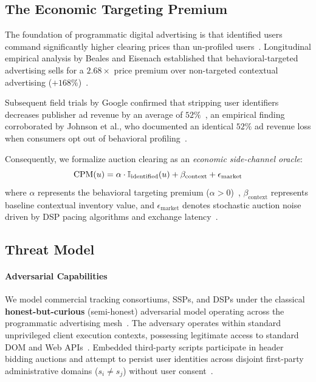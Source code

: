 \subsection{The Economic Targeting Premium}
\label{subsec:targeting_premium}

The foundation of programmatic digital advertising is that identified users command significantly higher clearing prices than un-profiled users~\cite{castelluccia2014selling, bashir2016tracing}. Longitudinal empirical analysis by Beales and Eisenach established that behavioral-targeted advertising sells for a $2.68\times$ price premium over non-targeted contextual advertising ($+168\%$)~\cite{beales2014empirical}. 

Subsequent field trials by Google confirmed that stripping user identifiers decreases publisher ad revenue by an average of $52\%$~\cite{google2019cookie}, an empirical finding corroborated by Johnson et al., who documented an identical $52\%$ ad revenue loss when consumers opt out of behavioral profiling~\cite{johnson2020consumer}. 

Consequently, we formalize auction clearing \cpm as an \textit{economic side-channel oracle}:
\begin{equation}
\text{CPM}(u) = \alpha \cdot \mathbb{I}_{\text{identified}}(u) + \beta_{\text{context}} + \epsilon_{\text{market}}
\label{eq:economic_oracle}
\end{equation}
where $\alpha$ represents the behavioral targeting premium ($\alpha > 0$)~\cite{beales2014empirical, johnson2020consumer}, $\beta_{\text{context}}$ represents baseline contextual inventory value, and $\epsilon_{\text{market}}$ denotes stochastic auction noise driven by DSP pacing algorithms and exchange latency~\cite{barysei2023investigating}.

\subsection{Threat Model}
\label{subsec:threat_model}

\paragraph{Adversarial Capabilities}
We model commercial tracking consortiums, SSPs, and DSPs under the classical \textbf{honest-but-curious} (semi-honest) adversarial model operating across the programmatic advertising mesh~\cite{papadopoulos2019cookie, oh2022cart}. 
The adversary operates within standard unprivileged client execution contexts, possessing legitimate access to standard DOM and Web APIs~\cite{bujlow2017survey, laperdrix2020browser}. 
Embedded third-party scripts participate in header bidding auctions and attempt to persist user identities across disjoint first-party administrative domains ($s_i \neq s_j$) without user consent~\cite{papadogiannakis2021user}. 

